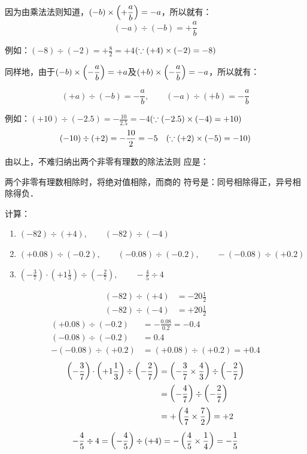 因为由乘法法则知道，$(-b)\times \left(+\dfrac{a}{b}\right)=-a$，所以就有：
\[(-a) \div (-b)=+\frac{a}{b}\]

例如：$(-8)\div (-2)=+\frac{8}{2}=+4$\quad $(\because (+4)\times(-2)=-8)$

同样地，由于$(-b)\times \left(-\dfrac{a}{b}\right)=+a$及$(+b)\times \left(-\dfrac{a}{b}\right)=-a$，所以就有：

\[(+a)\div (-b)=-\frac{a}{b},\qquad   (-a)\div (+b)=-\frac{a}{b}\]

例如：$(+10)\div (-2.5)=-\frac{10}{2.5}=-4$\quad $(\because (-2.5)\times(-4)=+10)$
\[(-10)\div (+2)=-\dfrac{10}{2}=-5\quad (\because (+2)\times(-5)=-10) \]

由以上，不难归纳出两个非零有理数的除法法则
应是：

\begin{blk}{}
	两个非零有理数相除时，将绝对值相除，而商的
	符号是：同号相除得正，异号相除得负．
\end{blk}

\begin{example}
	计算：
	\begin{enumerate}
		\item $(-82)\div (+4),\qquad (-82)\div (-4)$
		\item $(+0.08)\div (-0.2),\qquad (-0.08)\div (-0.2),\qquad -(-0.08)\div (+0.2)$
		\item $\left(-\frac{3}{7}\right)\cdot \left(+1\frac{1}{3}\right)\div \left(-\frac{2}{7}\right),\qquad -\frac{4}{5}\div 4$
	\end{enumerate}
\end{example}

\begin{solution}
	\[\begin{split}
	(-82)\div (+4)&=-20\frac{1}{2}\\
	(-82)\div (-4)&=+20\frac{1}{2}
	\end{split}\]
	\[\begin{split}
	(+0.08)\div (-0.2)&=-\frac{0.08}{0.2}=-0.4\\
	(-0.08)\div (-0.2)&=0.4\\
	-(-0.08)\div (+0.2)&=(+0.08)\div (+0.2)=+0.4
	\end{split}\]
	\[\begin{split}
	\left(-\dfrac{3}{7}\right)\cdot \left(+1\dfrac{1}{3}\right)\div \left(-\dfrac{2}{7}\right)&= \left(-\dfrac{3}{7}\times\dfrac{4}{3}\right) \div \left(-\dfrac{2}{7}\right)\\
	&=\left(-\dfrac{4}{7}\right)\div \left(-\dfrac{2}{7}\right)\\
	&=+\left(\dfrac{4}{7}\times\dfrac{7}{2}\right)=+2
	\end{split}\]
	\[-\dfrac{4}{5}\div 4=\left(-\dfrac{4}{5}\right)\div (+4)=-\left(\dfrac{4}{5}\times\dfrac{1}{4}\right)=-\dfrac{1}{5} \]
\end{solution}

